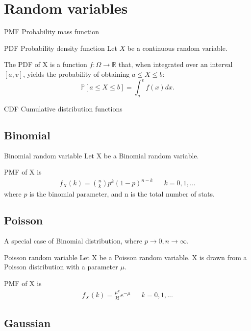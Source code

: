 \section{Random variables}

PMF \g Probability mass function


\begin{fact}{PDF \g Probability density function}{}
  Let $X$ be a continuous random variable.

  The PDF of X is a function $f:\Omega\rightarrow\mathbb{R}$ that, when integrated
  over an interval $[a,v]$, yields the probability of obtaining $a\le X \le b$:
  \[
    \mathbb{P}[a\le X \le b] = \int_{a}^{v}f(x)dx.
  \]
\end{fact}

CDF \g Cumulative distribution functions

\subsection{Binomial}

\begin{fact}{Binomial random variable}{}
  Let X be a Binomial random variable.

  PMF of X is
  \begin{align}
    f_X(k) = \binom{n}{k}p^k(1-p)^{n-k} &&k=0,1,...
  \end{align}
  where $p$ is the binomial parameter, and n is the total number of stats.

\end{fact}

\subsection{Poisson}
A special case of Binomial distribution, where $p\rightarrow0,n\rightarrow\infty$.

\begin{fact}{Poisson random variable}{}
  Let X be a Poisson random variable.
  X is drawn from a Poisson distribution with a parameter $\mu$.

  PMF of X is
  \begin{align}
    f_X(k) =  \frac{\mu^k}{k!}e^{-\mu} && k = 0,1,...
  \end{align}
\end{fact}

\subsection{Gaussian}

